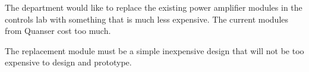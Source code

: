 The department would like to replace the existing power amplifier modules in the controls lab with something that is much less expensive.  The current modules from Quanser cost too much.
\bigskip

The replacement module must be a simple inexpensive design that will not be too expensive to design and prototype.
\bigskip